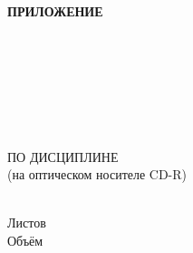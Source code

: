 \begin{ESKDtitlePage}
  \begin{flushright}
    \textbf{ПРИЛОЖЕНИЕ~\envCourseworkPrilLetter} \enspace\enspace
  \end{flushright}

  \begin{center}
    \envCourseworkEducation \\
    \envCourseworkUniversity \\
    \envCourseworkCathedra \\
  \end{center}

  \vfill

  \begin{center}
    \envCourseworkTitle \\
  \end{center}

  \vfill

  \begin{center}
    \textbf{\envCourseworkDocumentTitle} \\
    ПО ДИСЦИПЛИНЕ \envCourseworkSubject \\
    (на оптическом носителе CD-R) \\
  \end{center}

  \vfill

  \begin{center}
    \envCourseworkCode \\
    Листов \pageref{LastPage} \\
    Объём~\envCourseworkDiskSize \\
  \end{center}

  \vfill

  

  \vfill

  \begin{center}
    \ESKDtheYear
  \end{center}
\end{ESKDtitlePage}
